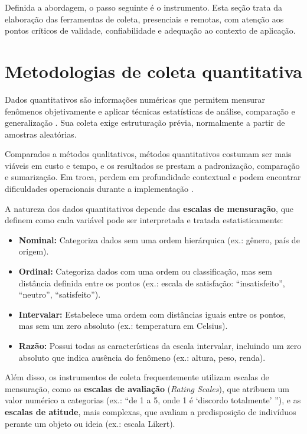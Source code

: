\documentclass[12pt, a4paper, openany]{book}
\begin{document}
Definida a abordagem, o passo seguinte \'e o instrumento. Esta se\c{c}\~ao trata da elabora\c{c}\~ao das ferramentas de coleta, presenciais e remotas, com aten\c{c}\~ao aos pontos cr\'iticos de validade, confiabilidade e adequa\c{c}\~ao ao contexto de aplica\c{c}\~ao.

\section{Metodologias de coleta quantitativa}

Dados quantitativos s\~ao informa\c{c}\~oes num\'ericas que permitem mensurar fen\^omenos objetivamente e aplicar t\'ecnicas estat\'isticas de an\'alise, compara\c{c}\~ao e generaliza\c{c}\~ao \citep{kabir2016methods,taherdoost2021data}. Sua coleta exige estrutura\c{c}\~ao pr\'evia, normalmente a partir de amostras aleat\'orias.

Comparados a m\'etodos qualitativos, m\'etodos quantitativos costumam ser mais vi\'aveis em custo e tempo, e os resultados se prestam a padroniza\c{c}\~ao, compara\c{c}\~ao e sumariza\c{c}\~ao. Em troca, perdem em profundidade contextual e podem encontrar dificuldades operacionais durante a implementa\c{c}\~ao \citep{taherdoost2021data}.

A natureza dos dados quantitativos depende das \textbf{escalas de mensura\c{c}\~ao}, que definem como cada vari\'avel pode ser interpretada e tratada estatisticamente:

\begin{itemize}
\item \textbf{Nominal:} Categoriza dados sem uma ordem hier\'arquica (ex.: g\^enero, pa\'is de origem).
\item \textbf{Ordinal:} Categoriza dados com uma ordem ou classifica\c{c}\~ao, mas sem dist\^ancia definida entre os pontos (ex.: escala de satisfa\c{c}\~ao: ``insatisfeito'', ``neutro'', ``satisfeito'').
\item \textbf{Intervalar:} Estabelece uma ordem com dist\^ancias iguais entre os pontos, mas sem um zero absoluto (ex.: temperatura em Celsius).
\item \textbf{Raz\~ao:} Possui todas as caracter\'isticas da escala intervalar, incluindo um zero absoluto que indica aus\^encia do fen\^omeno (ex.: altura, peso, renda).
\end{itemize}

Al\'em disso, os instrumentos de coleta frequentemente utilizam escalas de mensura\c{c}\~ao, como as \textbf{escalas de avalia\c{c}\~ao} (\textit{Rating Scales}), que atribuem um valor num\'erico a categorias (ex.: ``de 1 a 5, onde 1 \'e `discordo totalmente' ''), e as \textbf{escalas de atitude}, mais complexas, que avaliam a predisposi\c{c}\~ao de indiv\'iduos perante um objeto ou ideia (ex.: escala Likert).
\end{document}
